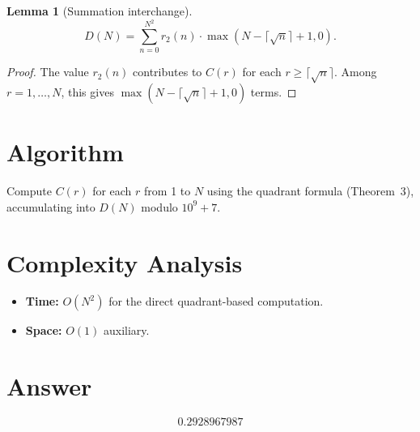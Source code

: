 \documentclass[11pt]{article}
\newtheorem{lemma}[theorem]{Lemma}
\theoremstyle{definition}
\begin{document}
\begin{lemma}[Summation interchange]
\[
D(N) = \sum_{n=0}^{N^2} r_2(n) \cdot \max(N - \lceil \sqrt{n} \rceil + 1, 0).
\]
\end{lemma}

\begin{proof}
The value $r_2(n)$ contributes to $C(r)$ for each $r \geq \lceil\sqrt{n}\rceil$. Among $r = 1, \ldots, N$, this gives $\max(N - \lceil\sqrt{n}\rceil + 1, 0)$ terms.
\end{proof}

\section{Algorithm}

Compute $C(r)$ for each $r$ from 1 to $N$ using the quadrant formula (Theorem~3), accumulating into $D(N)$ modulo $10^9 + 7$.

\section{Complexity Analysis}

\begin{itemize}
\item \textbf{Time:} $O(N^2)$ for the direct quadrant-based computation.
\item \textbf{Space:} $O(1)$ auxiliary.
\end{itemize}

\section{Answer}

\[
\boxed{0.2928967987}
\]
\end{document}
